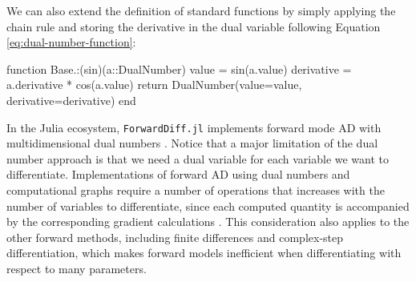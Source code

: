 
We can also extend the definition of standard functions by simply applying the chain rule and storing the derivative in the dual variable following Equation \eqref{eq:dual-number-function}:
\begin{jllisting}
function Base.:(sin)(a::DualNumber)
    value = sin(a.value)
    derivative = a.derivative * cos(a.value)
    return DualNumber(value=value, derivative=derivative)
end
\end{jllisting}
In the Julia ecosystem, \texttt{ForwardDiff.jl} implements forward mode AD with multidimensional dual numbers \cite{RevelsLubinPapamarkou2016}. 
Notice that a major limitation of the dual number approach is that we need a dual variable for each variable we want to differentiate. 
Implementations of forward AD using dual numbers and computational graphs require a number of operations that increases with the number of variables to differentiate, since each computed quantity is accompanied by the corresponding gradient calculations \cite{Griewack-on-AD}. 
This consideration also applies to the other forward methods, including finite differences and complex-step differentiation, which makes forward models inefficient when differentiating with respect to many parameters. 


